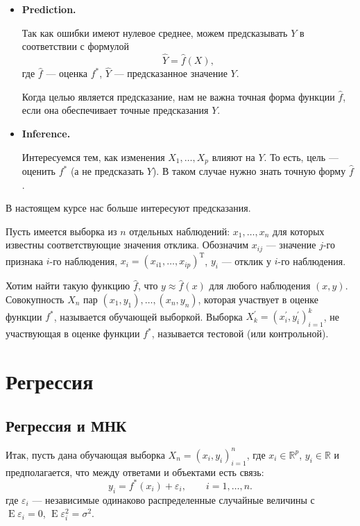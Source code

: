 \documentclass[11pt,colorlinks=true]{article}
\DeclareMathOperator{\T}{T}
\DeclareMathOperator{\E}{E}
\begin{document}
\begin{itemize}
\item \textbf{Prediction.}

Так как ошибки имеют нулевое среднее, можем предсказывать $Y$ в соответствии с формулой 
\begin{equation*}
\hat{Y}
=
\hat{f}(X),
\end{equation*}
где $\hat{f}$ --- оценка $f^{\ast}$, $\hat{Y}$ --- предсказанное значение $Y$.

Когда целью является предсказание, нам не важна точная форма функции $\hat{f}$, если она обеспечивает точные предсказания $Y$.
\item\textbf{ Inference.}

Интересуемся тем, как изменения $X_{1},\ldots,X_{p}$ влияют на $Y$. То есть, цель --- оценить $f^{\ast}$ (а не предсказать $Y$). В таком случае нужно знать точную форму $\hat{f}$.
\end{itemize}

В настоящем курсе нас больше интересуют предсказания.

Пусть имеется выборка из $n$ отдельных наблюдений: $x_{1},\ldots,x_{n}$ для которых известны соответствующие значения отклика. Обозначим $x_{ij}$ --- значение $j$-го признака $i$-го наблюдения, $x_{i}=(x_{i1},\ldots,x_{ip})^{\T}$,  $y_{i}$ --- отклик у $i$-го наблюдения.
 
 Хотим найти такую функцию $\hat{f}$, что $y\approx\hat{f}(x)$ для любого наблюдения $(x,y)$.  
 Совокупность $X_{n}$ пар $(x_{1}, y_{1}),\ldots, (x_{n},y_{n})$, которая участвует в оценке функции $f^{\ast}$, называется обучающей выборкой.
 Выборка $X_{k}^{\prime}=(x_{i}^{\prime},y_{i}^{\prime})_{i=1}^{k}$, не участвующая в оценке функции $f^{\ast}$, называется тестовой (или контрольной).

\section{Регрессия}

 
 \subsection{Регрессия и МНК}
 
Итак, пусть дана обучающая выборка $X_{n}=(x_{i},y_{i})_{i=1}^{n}$, где $x_{i}\in\mathbb{R}^{p}$, $y_{i}\in\mathbb{R}$ и предполагается, что между ответами и объектами есть связь:
\begin{equation*}
y_{i}=f^{\ast}(x_{i})+\varepsilon_{i},
\qquad 
i=1,\ldots,n.
\end{equation*}
где $\varepsilon_{i}$ --- независимые одинаково распределенные случайные величины с $\E\varepsilon_{i}=0$, $\E\varepsilon_{i}^{2}=\sigma^{2}$.
\end{document}
